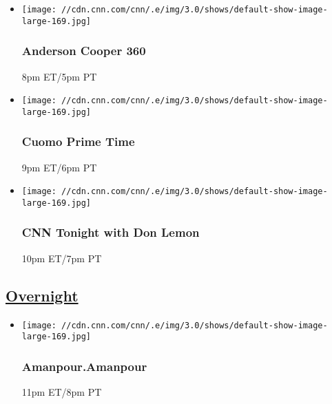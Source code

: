 \begin{itemize}
\item
  \texttt{[image: //cdn.cnn.com/cnn/.e/img/3.0/shows/default-show-image-large-169.jpg]}

  \hypertarget{anderson-cooper-360-2}{%
  \subsubsection{Anderson Cooper 360}\label{anderson-cooper-360-2}}

  8pm ET/5pm PT
\end{itemize}

\begin{itemize}
\item
  \texttt{[image: //cdn.cnn.com/cnn/.e/img/3.0/shows/default-show-image-large-169.jpg]}

  \hypertarget{cuomo-prime-time-2}{%
  \subsubsection{Cuomo Prime Time}\label{cuomo-prime-time-2}}

  9pm ET/6pm PT
\end{itemize}

\begin{itemize}
\item
  \texttt{[image: //cdn.cnn.com/cnn/.e/img/3.0/shows/default-show-image-large-169.jpg]}

  \hypertarget{cnn-tonight-with-don-lemon-2}{%
  \subsubsection{CNN Tonight with Don
  Lemon}\label{cnn-tonight-with-don-lemon-2}}

  10pm ET/7pm PT
\end{itemize}

\hypertarget{overnight--4}{%
\subsection{\texorpdfstring{\href{/tv/schedule/cnn/index.html}{Overnight}~}{Overnight~}}\label{overnight--4}}

\begin{itemize}
\item
  \texttt{[image: //cdn.cnn.com/cnn/.e/img/3.0/shows/default-show-image-large-169.jpg]}

  \hypertarget{amanpouramanpour--7}{%
  \subsubsection{Amanpour.Amanpour }\label{amanpouramanpour--7}}

  11pm ET/8pm PT
\end{itemize}


